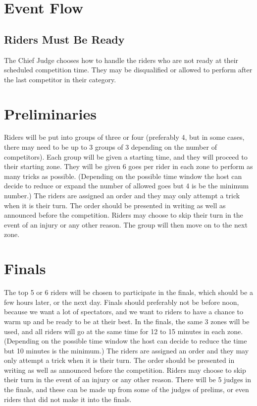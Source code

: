 \section{Event Flow}

\subsection{Riders Must Be Ready}
The Chief Judge chooses how to handle the riders who are not ready at their scheduled competition time.
They may be disqualified or allowed to perform after the last competitor in their category.

\section{Preliminaries}
Riders will be put into groups of three or four (preferably 4, but in some cases, there may need to be up to 3 groups of 3 depending on the number of competitors).
Each group will be given a starting time, and they will proceed to their starting zone.
They will be given 6 goes per rider in each zone to perform as many tricks as possible.
(Depending on the possible time window the host can decide to reduce or expand the number of allowed goes but 4 is be the minimum number.)
The riders are assigned an order and they may only attempt a trick when it is their turn.
The order should be presented in writing as well as announced before the competition.
Riders may choose to skip their turn in the event of an injury or any other reason.
The group will then move on to the next zone.

\section{Finals}
The top 5 or 6 riders will be chosen to participate in the finals, which should be a few hours later, or the next day.
Finals should preferably not be before noon, because we want a lot of spectators, and we want to riders to have a chance to warm up and be ready to be at their best.
In the finals, the same 3 zones will be used, and all riders will go at the same time for 12 to 15 minutes in each zone.
(Depending on the possible time window the host can decide to reduce the time but 10 minutes is the minimum.)
The riders are assigned an order and they may only attempt a trick when it is their turn.
The order should be presented in writing as well as announced before the competition.
Riders may choose to skip their turn in the event of an injury or any other reason.
There will be 5 judges in the finals, and these can be made up from some of the judges of prelims, or even riders that did not make it into the finals.

